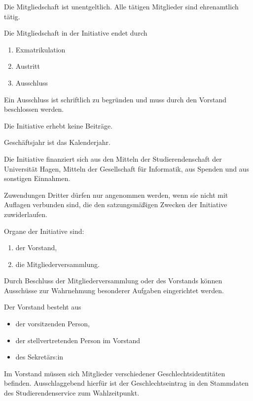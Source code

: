 \begin{contract}
Die Mitgliedschaft ist unentgeltlich. Alle tätigen Mitglieder sind ehrenamtlich tätig.

\label{sec:mitgliedschaftsende}

Die Mitgliedschaft in der Initiative endet durch
\begin{enumerate}
    \item Exmatrikulation
    \item Austritt
    \item Ausschluss
\end{enumerate}
Ein Ausschluss ist schriftlich zu begründen und muss durch den Vorstand beschlossen werden.

\label{sec:beiträge}

Die Initiative erhebt keine Beiträge.


\label{sec:geschäftsjahr}

Geschäftsjahr ist das Kalenderjahr.


Die Initiative finanziert sich aus den Mitteln der Studierendenschaft der Universität Hagen, Mitteln der Gesellschaft für Informatik, aus Spenden und aus sonstigen Einnahmen.

Zuwendungen Dritter dürfen nur angenommen werden, wenn sie nicht mit Auflagen verbunden sind, die den satzungsmäßigen Zwecken der Initiative zuwiderlaufen.


\label{sec:organe}

Organe der Initiative sind:
\begin{enumerate}
    \item der Vorstand,
    \item die Mitgliederversammlung.
\end{enumerate}
Durch Beschluss der Mitgliederversammlung oder des Vorstands können Ausschüsse zur Wahrnehmung besonderer Aufgaben eingerichtet werden.


\label{sec:vorstand}


Der Vorstand besteht aus 
\begin{itemize}
    \item der vorsitzenden Person,
    \item der stellvertretenden Person im Vorstand
    \item des Sekretärs:in
\end{itemize}  \label{sec:vorstand-posten}
Im Vorstand müssen sich Mitglieder verschiedener Geschlechtsidentitäten befinden. Ausschlaggebend hierfür ist der Geschlechtseintrag in den Stammdaten des Studierendenservice zum Wahlzeitpunkt.


\end{contract}

